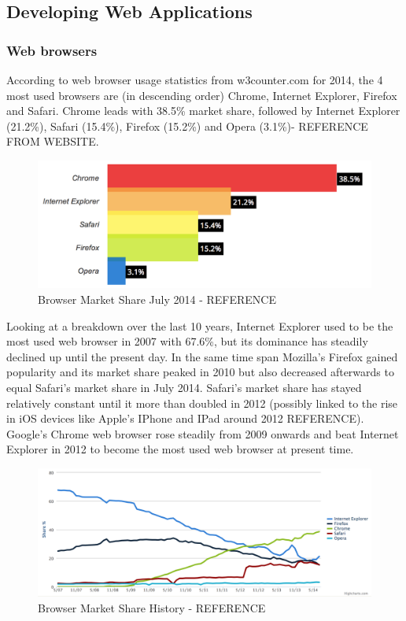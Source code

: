 \documentclass[a4paper,11pt,twoside]{article}
\begin{document}
\subsection{Developing Web Applications}

\subsubsection{Web browsers}

According to web browser usage statistics from w3counter.com for 2014, the 4 most used
browsers are (in descending order) Chrome, Internet Explorer, Firefox
and Safari. Chrome leads with 38.5\% market share, followed by Internet Explorer (21.2\%), Safari (15.4\%), Firefox (15.2\%) and Opera (3.1\%)- REFERENCE FROM WEBSITE.

\begin{figure}[ht!]
\centering
\includegraphics[width=165mm]{graphics/webStats_01.png}
\caption{Browser Market Share July 2014 - REFERENCE}
\label{fig:UIdesign1}
\end{figure}

Looking at a breakdown over the last 10 years, Internet Explorer used to be the most used web browser in 2007 with 67.6\%, but its dominance has steadily declined up until the present day. In the same time span Mozilla's Firefox gained popularity and its market share peaked in 2010 but also decreased afterwards to equal Safari's market share in July 2014. Safari's market share has stayed relatively constant until it more than doubled in 2012 (possibly linked to the rise in iOS devices like Apple's IPhone and IPad around 2012 REFERENCE). Google's Chrome web browser rose steadily from 2009 onwards and beat Internet Explorer in 2012 to become the most used web browser at present time.

\begin{figure}[ht!]
\centering
\includegraphics[width=165mm]{graphics/webStats_02.png}
\caption{Browser Market Share History - REFERENCE}
\label{fig:UIdesign1}
\end{figure}
\end{document}

